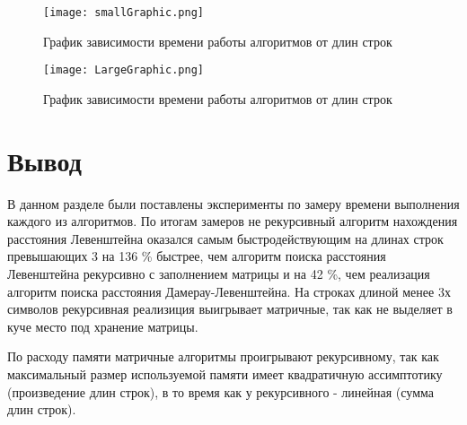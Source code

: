         \begin{figure}[h!]
            \centering
            \texttt{[image: smallGraphic.png]}
            \caption{График зависимости времени работы алгоритмов от длин строк}
            \label{graph:test:1}

            \texttt{[image: LargeGraphic.png]}
            \caption{График зависимости времени работы алгоритмов от длин строк}
            \label{graph:test:2}
        \end{figure}




    \section{Вывод}
        В данном разделе были поставлены эксперименты по замеру времени
        выполнения каждого из алгоритмов. По итогам замеров не рекурсивный 
        алгоритм нахождения расстояния Левенштейна оказался самым быстродействующим
        на длинах строк превышающих 3 на 136 \% быстрее, чем алгоритм поиска
        расстояния Левенштейна рекурсивно с заполнением матрицы и на 42 \%,
        чем реализация алгоритм поиска расстояния Дамерау-Левенштейна. На строках
        длиной менее 3х символов рекурсивная реализиция выигрывает матричные, так
        как не выделяет в куче место под хранение матрицы.  
        
        По расходу памяти матричные алгоритмы проигрывают рекурсивному, так как
        максимальный размер используемой памяти имеет квадратичную ассимптотику
        (произведение длин строк), в то время как у рекурсивного - линейная (сумма длин строк).


\newpage